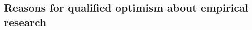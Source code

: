 \documentclass[11pt]{article}
\begin{document}






\subsection{Reasons for qualified optimism about empirical research}
\end{document}
